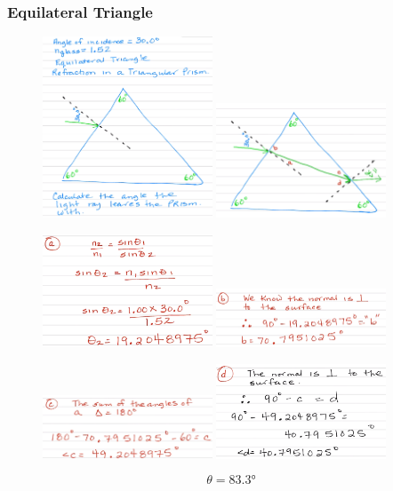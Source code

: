 \documentclass[a4paper,12pt]{article}
\begin{document}
\subsubsection{Equilateral Triangle}
\begin{figure}[H]
    \centering
    \includegraphics[width=0.45\textwidth]{ex-tri-1}
    \includegraphics[width=0.45\textwidth]{ex-tri-2}
\end{figure}
\begin{figure}[H]
    \centering
    \includegraphics[width=0.45\textwidth]{ex-tri-3}
    \includegraphics[width=0.45\textwidth]{ex-tri-4}
\end{figure}
\begin{figure}[H]
    \centering
    \includegraphics[width=0.45\textwidth]{ex-tri-5}
    \includegraphics[width=0.45\textwidth]{ex-tri-6}
\end{figure}
$$\theta = \ang{83.3}$$
\end{document}

